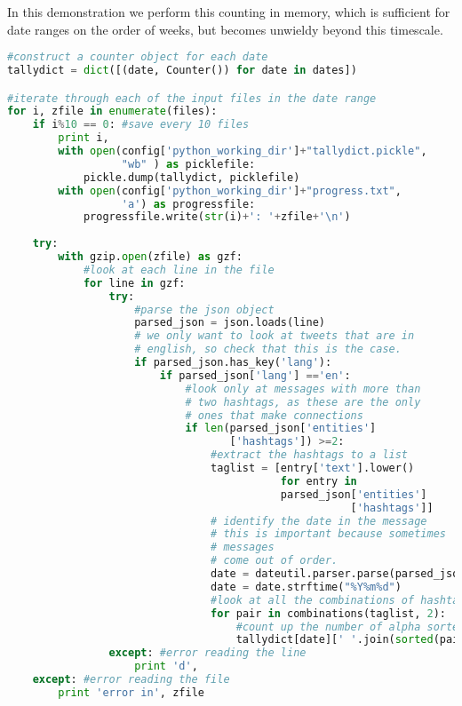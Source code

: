 \documentclass[12pt]{article}
\begin{document}
In this demonstration we perform this counting in memory, which is sufficient for date ranges on the order of weeks, but becomes unwieldy beyond this timescale.

\begin{lstlisting}[language=Python]
#construct a counter object for each date
tallydict = dict([(date, Counter()) for date in dates])

#iterate through each of the input files in the date range
for i, zfile in enumerate(files):
    if i%10 == 0: #save every 10 files
        print i,
        with open(config['python_working_dir']+"tallydict.pickle", 
                  "wb" ) as picklefile:
            pickle.dump(tallydict, picklefile)  
        with open(config['python_working_dir']+"progress.txt",
                  'a') as progressfile:    
            progressfile.write(str(i)+': '+zfile+'\n')
            
    try:
        with gzip.open(zfile) as gzf:
            #look at each line in the file
            for line in gzf:
                try:
                    #parse the json object 
                    parsed_json = json.loads(line)
                    # we only want to look at tweets that are in 
                    # english, so check that this is the case.
                    if parsed_json.has_key('lang'):
                        if parsed_json['lang'] =='en':
                            #look only at messages with more than 
                            # two hashtags, as these are the only 
                            # ones that make connections
                            if len(parsed_json['entities']
                                   ['hashtags']) >=2:
                                #extract the hashtags to a list 
                                taglist = [entry['text'].lower() 
                                           for entry in 
                                           parsed_json['entities']
                                                      ['hashtags']]
                                # identify the date in the message 
                                # this is important because sometimes 
                                # messages 
                                # come out of order.
                                date = dateutil.parser.parse(parsed_json['created_at'])
                                date = date.strftime("%Y%m%d") 
                                #look at all the combinations of hashtags in the set
                                for pair in combinations(taglist, 2):
                                    #count up the number of alpha sorted tag pairs
                                    tallydict[date][' '.join(sorted(pair))] += 1
                except: #error reading the line
                    print 'd',
    except: #error reading the file
        print 'error in', zfile
\end{lstlisting}
\end{document}

